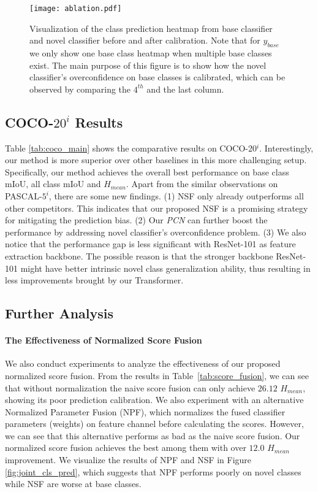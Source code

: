 \documentclass[journal]{IEEEtran}
\begin{document}
\begin{figure*}[ht]
    \centering
    \texttt{[image: ablation.pdf]}
\caption{Visualization of the class prediction heatmap from base classifier and novel classifier before and after calibration. Note that for $y_{base}$ we only show one base class heatmap when multiple base classes exist. The main purpose of this figure is to show how the novel classifier's overconfidence on base classes is calibrated, which can be observed by comparing the $4^{th}$ and the last column.}
    \label{fig:atten_com}
\end{figure*}

\subsection{COCO-$20^{i}$ Results}
Table \ref{tab:coco_main} shows the comparative results on COCO-20$^{i}$.
Interestingly, our method is more superior over other baselines in this more challenging setup.
Specifically, our method achieves the overall best performance on base class mIoU, all class mIoU and $H_{mean}$.
Apart from the similar observations on PASCAL-$5^{i}$, there are some new findings.
(1) NSF only already outperforms all other competitors. 
This indicates that our proposed NSF is a promising strategy for mitigating the prediction bias.
(2) Our \textit{PCN} can further boost the performance by addressing novel classifier's overconfidence problem.
(3) We also notice that the performance gap is less significant with ResNet-101 as feature extraction backbone.
The possible reason is that the stronger backbone ResNet-101 might have better intrinsic novel class generalization ability, thus resulting in less improvements brought by our Transformer.

\subsection{Further Analysis}

\paragraph{The Effectiveness of Normalized Score Fusion}
We also conduct experiments to analyze the effectiveness of our proposed normalized score fusion. From the results in Table~\ref{tab:score_fusion}, we can see that without normalization the naive score fusion can only achieve $26.12$ $H_{mean}$, showing its poor prediction calibration. 
We also experiment with an alternative Normalized Parameter Fusion (NPF), which normalizes the fused classifier parameters (weights) on feature channel before calculating the scores. 
However, we can see that this alternative performs as bad as the naive score fusion. 
Our normalized score fusion achieves the best among them with over $12.0$ $H_{mean}$ improvement. We visualize the results of NPF and NSF in Figure \ref{fig:joint_cls_pred}, which suggests that NPF performs poorly on novel classes while NSF are worse at base classes.
\end{document}
